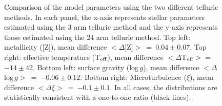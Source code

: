 \begin{figure}
\begin{center}
 \end{center}
 \caption[Best-fit parameter comparison using the two telluric methods]{
            Comparison of the model parameters using the two different telluric methods.
            In each panel, the x-axis represents stellar parameters estimated using the 3 arm telluric
            method and the y-axis represents those estimated using the 24 arm telluric method.
            Top left: metallicity ([Z]), mean difference
            $<\Delta[$Z$]>$~=~$0.04 \pm 0.07$.
            Top right: effective temperature (T$_{\rm eff}$), mean difference
            $<\Delta $T$_{\rm eff}>$~=~$-14 \pm 42$.
            Bottom left: surface gravity (log\,$g$), mean difference
            $<\Delta$ log\,$g>$~=~$-0.06 \pm 0.12$.
            Bottom right: Microturbulence ($\xi$), mean difference
            $<\Delta \xi>$~=~$-0.1 \pm 0.1$.
            In all cases, the distributions are statistically consistent with a one-to-one ratio (black lines).
          }
 \label{fig:3vs24AT}
\end{figure}


